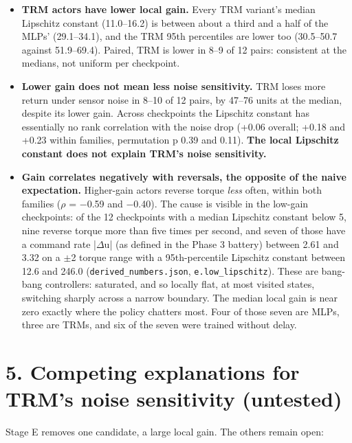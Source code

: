 \documentclass[11pt]{article}
\begin{document}
\begin{itemize}
\item \textbf{TRM actors have lower local gain.} Every TRM variant's median Lipschitz constant (11.0--16.2) is between about a third and a half of the MLPs' (29.1--34.1), and the TRM 95th percentiles are lower too (30.5--50.7 against 51.9--69.4). Paired, TRM is lower in 8--9 of 12 pairs: consistent at the medians, not uniform per checkpoint.
\item \textbf{Lower gain does not mean less noise sensitivity.} TRM loses more return under sensor noise in 8--10 of 12 pairs, by 47--76 units at the median, despite its lower gain. Across checkpoints the Lipschitz constant has essentially no rank correlation with the noise drop (+0.06 overall; +0.18 and +0.23 within families, permutation p 0.39 and 0.11). \textbf{The local Lipschitz constant does not explain TRM's noise sensitivity.}
\item \textbf{Gain correlates negatively with reversals, the opposite of the naive expectation.} Higher-gain actors reverse torque \emph{less} often, within both families ($\rho$ = $-$0.59 and $-$0.40). The cause is visible in the low-gain checkpoints: of the 12 checkpoints with a median Lipschitz constant below 5, nine reverse torque more than five times per second, and seven of those have a command rate |$\Delta$u| (as defined in the Phase 3 battery) between 2.61 and 3.32 on a $\pm$2 torque range with a 95th-percentile Lipschitz constant between 12.6 and 246.0 (\texttt{derived\_\allowbreak{}numbers.\allowbreak{}json}, \texttt{e.\allowbreak{}low\_\allowbreak{}lipschitz}). These are bang-bang controllers: saturated, and so locally flat, at most visited states, switching sharply across a narrow boundary. The median local gain is near zero exactly where the policy chatters most. Four of those seven are MLPs, three are TRMs, and six of the seven were trained without delay.
\end{itemize}



\section*{5. Competing explanations for TRM's noise sensitivity (untested)}



Stage E removes one candidate, a large local gain. The others remain open:
\end{document}
